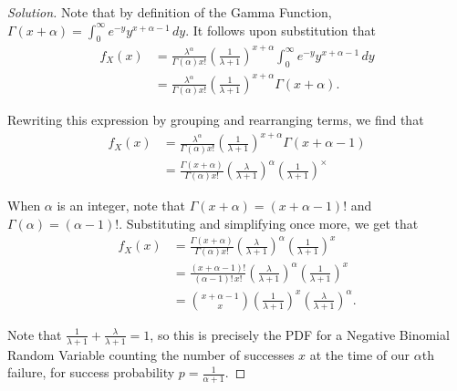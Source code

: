 \documentclass[11pt]{article}
\newenvironment{solution}
  {\renewcommand\qedsymbol{$\blacksquare$}\begin{proof}[Solution]}
  {\end{proof}}
\begin{document}
\begin{enumerate}
\begin{solution}
    Note that by definition of the Gamma Function, $\Gamma(x + \alpha) = \int_{0}^{\infty} e^{-y}y^{x + \alpha - 1} \, dy$. It follows upon substitution that
    \begin{align*}
        f_X(x) &= \frac{\lambda^\alpha}{\Gamma(\alpha) x!} \left( \frac{1}{\lambda + 1} \right)^{x + \alpha} \int_{0}^{\infty} e^{-y}y^{x + \alpha - 1} \, dy \\
        &= \frac{\lambda^\alpha}{\Gamma(\alpha) x!} \left( \frac{1}{\lambda + 1} \right)^{x + \alpha} \Gamma(x + \alpha).
    \end{align*}    

    Rewriting this expression by grouping and rearranging terms, we find that
    \begin{align*}
        f_X(x) &= \frac{\lambda^\alpha}{\Gamma(\alpha) x!} \left( \frac{1}{\lambda + 1} \right)^{x + \alpha} \Gamma(x + \alpha - 1) \\
        &= \frac{\Gamma(x + \alpha)}{\Gamma(\alpha)x!} \left( \frac{\lambda}{\lambda + 1} \right)^\alpha \left( \frac{1}{\lambda + 1} \right)^\times   
    \end{align*}   

    When $\alpha$ is an integer, note that $\Gamma(x + \alpha) = (x + \alpha - 1)!$ and $\Gamma(\alpha) = (\alpha - 1)!$. Substituting and simplifying
    once more, we get that
    \begin{align*}
        f_X(x) &= \frac{\Gamma(x + \alpha)}{\Gamma(\alpha)x!} \left( \frac{\lambda}{\lambda + 1} \right)^\alpha \left( \frac{1}{\lambda + 1} \right)^x   \\
        &= \frac{(x + \alpha - 1)!}{(\alpha - 1)! \, x!}\left( \frac{\lambda}{\lambda + 1} \right)^\alpha \left( \frac{1}{\lambda + 1} \right)^x \\
        &= \binom{x + \alpha - 1}{x}\left( \frac{1}{\lambda + 1} \right)^x \left( \frac{\lambda}{\lambda + 1} \right)^\alpha .
    \end{align*}   

    Note that $\frac{1}{\lambda + 1} + \frac{\lambda}{\lambda + 1} = 1$, so this is precisely the PDF for a Negative Binomial Random Variable counting the number of successes $x$ at the time of our $\alpha$th failure, for success probability
    $\boxed{p = \frac{1}{\alpha + 1}}$. 
    \end{solution}
\end{enumerate}
\end{document}
